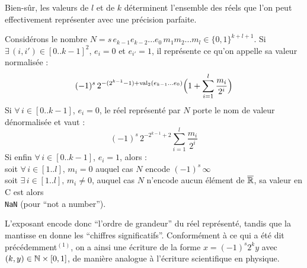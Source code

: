 		\begin{Remarque}
			Bien-sûr, les valeurs de \(l\) et de \(k\) déterminent l'ensemble des réels que l'on peut effectivement représenter avec une précision parfaite.
		\end{Remarque}
		
		Considérons le nombre \(N = s\,e_{k-1}e_{k-2}...e_0\,m_1m_2...m_l \in \{0,1\}^{k+l+1}\). \nt
		\eqskip{2mm}
		Si \(\exists\,(i,i')\in[0..k-1]^2\), \(e_i=0\) et \(e_{i'}=1\), il représente ce qu'on appelle sa valeur normalisée :
		\[
		(-1)^s\,2^{-(2^{k-1}-1)+\operatorname{val}_2(e_{k-1}...e_0)} \Big(1+\sum_{i=1}^{l} \frac{m_i}{2^i}\Big)
		\]
		Si \(\forall\,i\in[0..k-1]\), \(e_i=0\), le réel représenté par \(N\) porte le nom de valeur dénormalisée et vaut :
		\[
		(-1)^s\,2^{-2^{k-1}+2}\sum_{i=1}^l\frac{m_i}{2^i}
		\]
		Si enfin \(\forall\,i\in[0..k-1]\), \(e_i=1\), alors : \\
		 \bdot soit \(\forall\,i\in[1..l],\,m_i=0\) auquel cas \(N\) encode \((-1)^s\,\infty\) \\
		 \bdot soit \(\exists\,i\in[1..l],\,m_i\neq0\), auquel cas \(N\) n'encode aucun élément de \(\overline{\mathbb{R}}\), sa valeur en C est alors \\  \texttt{NaN} (pour ``not a number'').
			
			\begin{Remarque}
				L'exposant encode donc ``l'ordre de grandeur'' du réel représenté, tandis que la mantisse en donne les ``chiffres significatifs''. Conformément à ce qui a été dit précédemment\(^{(1)}\), on a ainsi une écriture de la forme \(x = (-1)^s 2^k y\) avec \((k,y)\in\mathbb{N}\times[0,1]\), de manière analogue à l'écriture scientifique en physique.
			\end{Remarque}
			
